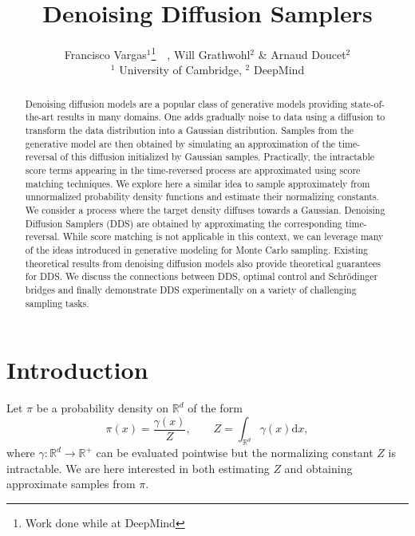\documentclass{article} %
\title{Denoising Diffusion Samplers}
\author{Francisco Vargas$^{1}$\thanks{Work done while at DeepMind}~~, Will Grathwohl$^2$ \& Arnaud Doucet$^2$ \\
$^{1}$ University of Cambridge, $^{2}$ DeepMind
}
\begin{document}
\maketitle

\begin{abstract}
Denoising diffusion models are a popular class of generative models providing state-of-the-art results in many domains. One adds gradually noise to data using a diffusion to transform the data distribution into a Gaussian distribution. Samples from the generative model are then obtained by simulating an approximation of the time-reversal of this diffusion initialized by Gaussian samples. Practically, the intractable score terms appearing in the time-reversed process are approximated using score matching techniques. We explore here a similar idea to sample approximately from unnormalized probability density functions and estimate their normalizing constants. We consider a process where the target density diffuses towards a Gaussian. Denoising Diffusion Samplers (DDS) are obtained by approximating the corresponding time-reversal.  While score matching is not applicable in this context, we can leverage many of the ideas introduced in generative modeling for Monte Carlo sampling. Existing theoretical results from denoising diffusion models also provide theoretical guarantees for DDS. We discuss the connections between DDS, optimal control and Schr\"odinger bridges and finally demonstrate DDS experimentally on a variety of challenging sampling tasks.
\end{abstract}

\section{Introduction}
Let $\pi$ be a probability density on $\mathbb{R}^d$ of the form
\begin{equation}
    \pi(x)=\frac{\gamma(x)}{Z},\qquad Z=\int_{\mathbb{R}^d} \gamma(x) \mathrm{d}x,
\end{equation}
where $\gamma:\mathbb{R}^d \rightarrow \mathbb{R}^{+}$ can be evaluated pointwise but the normalizing constant $Z$ is intractable. We are here interested in both estimating $Z$ and obtaining approximate samples from $\pi$.
\end{document}
